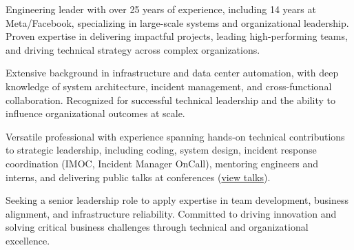 
\begin{cvparagraph}

    Engineering leader with over 25 years of experience, including 14 years at Meta/Facebook,
    specializing in large-scale systems and organizational leadership. Proven expertise in
    delivering impactful projects, leading high-performing teams, and driving technical strategy
    across complex organizations.

    Extensive background in infrastructure and data center automation, with deep knowledge of
    system architecture, incident management, and cross-functional collaboration. Recognized for
    successful technical leadership and the ability to influence organizational outcomes at scale.

    Versatile professional with experience spanning hands-on technical contributions to strategic
    leadership, including coding, system design, incident response coordination (IMOC, Incident Manager OnCall),
    mentoring engineers and interns, and delivering public talks at conferences (\href{https://www.angelofailla.com/public_talks/}{view talks}).

    Seeking a senior leadership role to apply expertise in team development, business alignment,
    and infrastructure reliability. Committed to driving innovation and solving critical business
    challenges through technical and organizational excellence.
\end{cvparagraph}